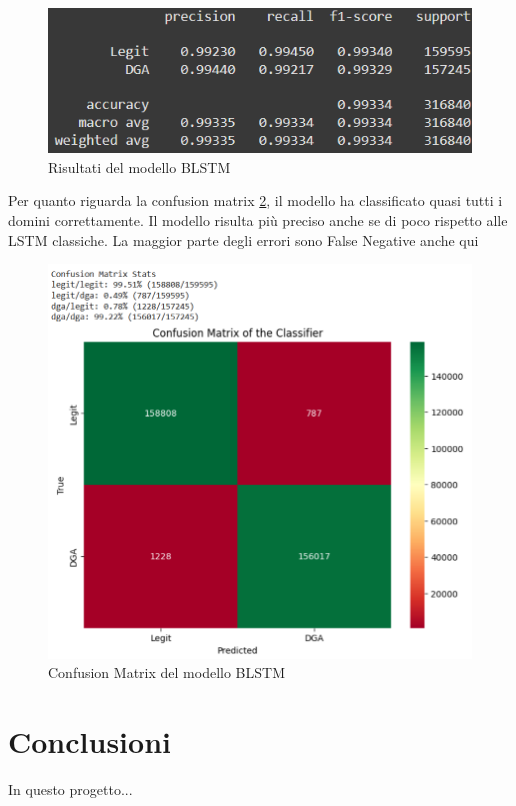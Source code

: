 \documentclass[12pt,a4paper,openright,twoside]{book}
\begin{document}
\begin{figure}[H]
    \centering
    \includegraphics[width=.8\linewidth]{figures/BLSTM_results.png}
    \caption{Risultati del modello BLSTM}
    \label{fig:BLSTM results}
\end{figure}

\noindent Per quanto riguarda la confusion matrix \ref{fig:BLSTM confusion matrix}, il modello ha classificato
quasi tutti i domini correttamente. Il modello risulta più preciso anche se di poco rispetto alle LSTM classiche.
La maggior parte degli errori sono False Negative anche qui
\begin{figure}[H]
    \centering
    \includegraphics[width=.8\linewidth]{figures/BLSTM conf_matr.png}
    \caption{Confusion Matrix del modello BLSTM}
    \label{fig:BLSTM confusion matrix}
\end{figure}

\chapter{Conclusioni}
In questo progetto...

\end{document}
